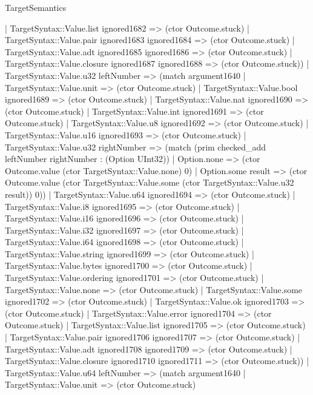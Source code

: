 \begin{lexlean}{TargetSemantics}
\begin{semanticmodule}
{              | TargetSyntax::Value.list ignored1682 => (ctor Outcome.stuck)
              | TargetSyntax::Value.pair ignored1683 ignored1684 => (ctor Outcome.stuck)
              | TargetSyntax::Value.adt ignored1685 ignored1686 => (ctor Outcome.stuck)
              | TargetSyntax::Value.closure ignored1687 ignored1688 => (ctor Outcome.stuck))
            | TargetSyntax::Value.u32 leftNumber => (match argument1640
              | TargetSyntax::Value.unit => (ctor Outcome.stuck)
              | TargetSyntax::Value.bool ignored1689 => (ctor Outcome.stuck)
              | TargetSyntax::Value.nat ignored1690 => (ctor Outcome.stuck)
              | TargetSyntax::Value.int ignored1691 => (ctor Outcome.stuck)
              | TargetSyntax::Value.u8 ignored1692 => (ctor Outcome.stuck)
              | TargetSyntax::Value.u16 ignored1693 => (ctor Outcome.stuck)
              | TargetSyntax::Value.u32 rightNumber => (match (prim checked_add leftNumber rightNumber : (Option UInt32))
                | Option.none => (ctor Outcome.value (ctor TargetSyntax::Value.none) 0)
                | Option.some result => (ctor Outcome.value (ctor TargetSyntax::Value.some (ctor TargetSyntax::Value.u32 result)) 0))
              | TargetSyntax::Value.u64 ignored1694 => (ctor Outcome.stuck)
              | TargetSyntax::Value.i8 ignored1695 => (ctor Outcome.stuck)
              | TargetSyntax::Value.i16 ignored1696 => (ctor Outcome.stuck)
              | TargetSyntax::Value.i32 ignored1697 => (ctor Outcome.stuck)
              | TargetSyntax::Value.i64 ignored1698 => (ctor Outcome.stuck)
              | TargetSyntax::Value.string ignored1699 => (ctor Outcome.stuck)
              | TargetSyntax::Value.bytes ignored1700 => (ctor Outcome.stuck)
              | TargetSyntax::Value.ordering ignored1701 => (ctor Outcome.stuck)
              | TargetSyntax::Value.none => (ctor Outcome.stuck)
              | TargetSyntax::Value.some ignored1702 => (ctor Outcome.stuck)
              | TargetSyntax::Value.ok ignored1703 => (ctor Outcome.stuck)
              | TargetSyntax::Value.error ignored1704 => (ctor Outcome.stuck)
              | TargetSyntax::Value.list ignored1705 => (ctor Outcome.stuck)
              | TargetSyntax::Value.pair ignored1706 ignored1707 => (ctor Outcome.stuck)
              | TargetSyntax::Value.adt ignored1708 ignored1709 => (ctor Outcome.stuck)
              | TargetSyntax::Value.closure ignored1710 ignored1711 => (ctor Outcome.stuck))
            | TargetSyntax::Value.u64 leftNumber => (match argument1640
              | TargetSyntax::Value.unit => (ctor Outcome.stuck)
}
\end{semanticmodule}
\end{lexlean}
